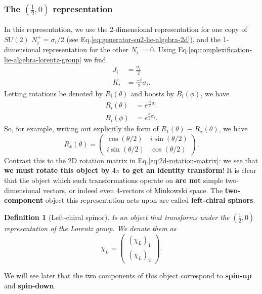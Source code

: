 \documentclass[11pt]{article}
\numberwithin{equation}{section}
\newtheorem{defn}{Definition}[section]
\begin{document}
\subsubsection{The $(\frac{1}{2},0)$ representation}
In this representation, we use the 2-dimensional representation for one copy of $SU(2)$ $N_i^+ = \sigma_i/2$ (see Eq.\eqref{eq:generator-su2-lie-algebra-2d}), and the 1-dimensional representation for the other $N_i^-=0$. Using Eq.\eqref{eq:complexification-lie-algebra-lorentz-group} we find
\begin{align}
J_i &= \frac{\sigma_i}{2} \\
K_i &= \frac{-i}{2} \sigma_i.
\end{align}
Letting rotations be denoted by $R_i(\theta)$ and boosts by $B_i(\phi)$, we have
\begin{align}
R_i(\theta) &= e^{\frac{i \theta}{2}  \sigma_i} \\
B_i(\phi) &= e^{\frac{\phi}{2}  \sigma_i}.
\end{align}
So, for example, writing out explicitly the form of $R_1(\theta) \equiv R_x(\theta)$, we have
\begin{equation}
R_x(\theta) = \begin{pmatrix}
\cos(\theta/2) & i \sin(\theta/2) \\
i \sin(\theta/2) & \cos(\theta/2)
\end{pmatrix}. \label{eq:rotation-left-chiral-lorentz-tfm}
\end{equation}
Contrast this to the 2D rotation matrix in Eq.\eqref{eq:2d-rotation-matrix}: we see that \textbf{we must rotate this object by $4\pi$ to get an identity transform}! It is clear that the object which such transformations operate on \textbf{are not} simple two-dimensional vectors, or indeed even 4-vectors of Minkowski space. The \textbf{two-component} object  this representation acts upon are called \textbf{left-chiral spinors}.
\begin{defn}[Left-chiral spinor]
Is an object that transforms under the $(\frac{1}{2},0)$ representation of the Lorentz group. We denote them as 
\begin{equation}
\chi_L = \begin{pmatrix}
(\chi_L)_1 \\
(\chi_L)_2 
\end{pmatrix}.
\end{equation}
\end{defn}
\noindent We will see later that the two components of this object correspond to \textbf{spin-up} and \textbf{spin-down}. 
\end{document}
